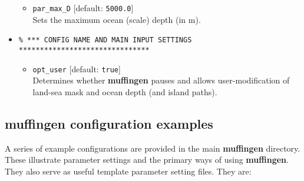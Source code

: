 \documentclass[11pt,fleqn]{book} %
\begin{document}
\begin{itemize}
\begin{itemize}[noitemsep]
\item [] \texttt{par\_max\_D} [default: \texttt{5000.0}]
\\Sets the maximum ocean (scale) depth (in m).
\end{itemize}

\vspace{2mm}
\item []
\small\vspace{-2pt}\begin{verbatim}
% *** CONFIG NAME AND MAIN INPUT SETTINGS *******************************
\end{verbatim}\vspace{-2pt}\normalsize

\begin{itemize}[noitemsep]
\vspace{1mm}

\item [] \texttt{opt\_user} [default: \texttt{true}]
\\Determines whether \textbf{muffingen} pauses and allows user-modification of land-sea mask and ocean depth (and island paths).
\end{itemize}

\end{itemize}


\subsection{muffingen configuration examples}

A series of example configurations are provided in the main \textbf{muffingen} directory. These illustrate parameter settings and the primary ways of using \textbf{muffingen}. They also serve as useful template parameter setting files.  They are:
\end{document}
